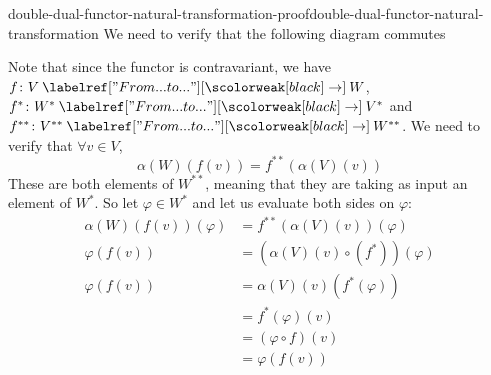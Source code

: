 \documentclass[preview]{standalone}
\begin{document}
\begin{snippetproof}{double-dual-functor-natural-transformation-proof}{double-dual-functor-natural-transformation}{}
    We need to verify that the following diagram commutes
    \begin{center}
    \end{center}
    Note that since the functor is contravariant, we have
    \(f\colon V \fromto W\), \(f^* \colon W^* \fromto V^*\)
    and \(f^{**} \colon V^{**} \fromto W^{**}\).
    We need to verify that \(\forall v \in V\),
    \[
        \alpha(W)(f(v)) = f^{**}(\alpha(V)(v))
    \]
    These are both elements of \(W^{**}\), meaning that they are \function[functions]
    taking as input an element of \(W^*\). So let \(\varphi \in W^*\)
    and let us evaluate both sides on \(\varphi\):
    \begin{align*}
        \alpha(W)(f(v))(\varphi) &= f^{**}(\alpha(V)(v))(\varphi) \\
        \varphi(f(v)) &= (\alpha(V)(v) \circ (f^*))(\varphi) \\
        \varphi(f(v)) &= \alpha(V)(v) (f^*(\varphi)) \\
        &= f^*(\varphi)(v) \\
        &= (\varphi \circ f)(v) \\
        &= \varphi(f(v))
    \end{align*}
\end{snippetproof}
\end{document}
